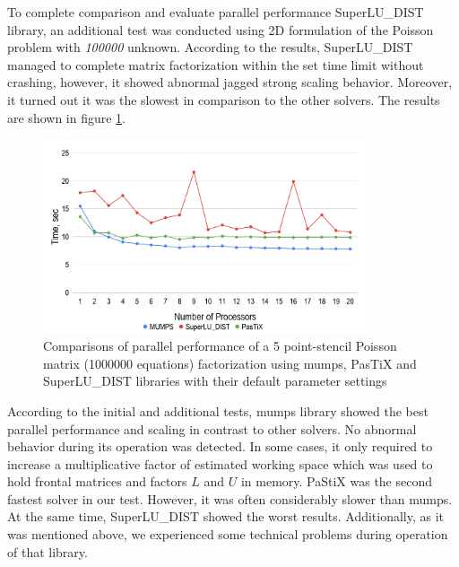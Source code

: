
To complete comparison and evaluate parallel performance SuperLU\_DIST library, an additional test was conducted using 2D formulation of the Poisson problem with \textit{100000} unknown. According to the results, SuperLU\_DIST managed to complete matrix factorization within the set time limit without crashing, however, it showed abnormal jagged strong scaling behavior. Moreover, it turned out it was the slowest in comparison to the other solvers. The results are shown in figure \ref{fig:5-point-stencil-solvers-comparison}.\\



\figpointer{\ref{fig:5-point-stencil-solvers-comparison}}
\begin{figure}[htpb]
  \centering
  \includegraphics[width=0.85\textwidth]{figures/chapter-2/solvers-comparison-5-point-stencil.png}
\caption{Comparisons of parallel performance of a 5 point-stencil Poisson matrix (1000000  equations) factorization using 
\gls{mumps}, PasTiX and SuperLU\_DIST libraries with their default parameter settings}
\label{fig:5-point-stencil-solvers-comparison}
\end{figure}


According to the initial and additional tests, \gls{mumps} library showed the best parallel performance and scaling in contrast to other solvers. No abnormal behavior during its operation was detected. In some cases, it only required to increase a multiplicative factor of estimated working space which was used to hold frontal matrices and factors $L$ and $U$ in memory. PaStiX was the second fastest solver in our test. However,  it was often considerably slower than \gls{mumps}. At the same time, SuperLU\_DIST showed the worst results. Additionally, as it was mentioned above, we experienced some technical problems during operation of that library.\\


